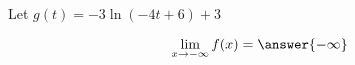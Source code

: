 \documentclass{ximera}
\author{Lee Wayand}
\begin{document}
\begin{exercise}


\begin{question}



Let $g(t) = -3 \ln(-4t + 6) + 3$



\[
\lim\limits_{x \to -\infty} f(x) = \answer{-\infty} 
\]





\end{question}










\end{exercise}
\end{document}
